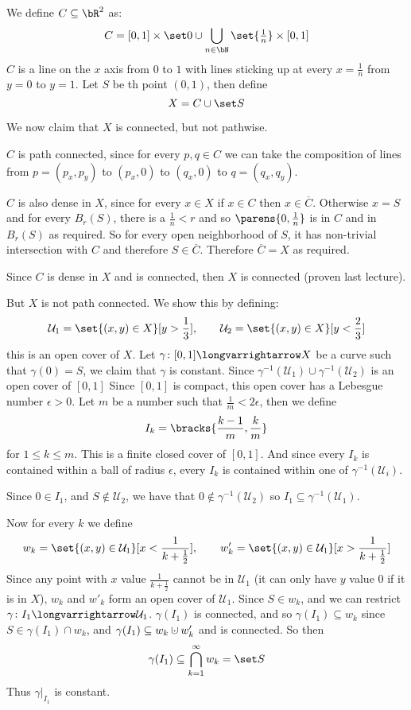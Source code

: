 \documentclass[10pt]{article}
\def\mU{\mathcal{U}}
\def\longto{\longvarrightarrow}
\begin{document}
\begin{exam*}

    We define $C\subseteq\bR^2$ as:
    \[ C = [0,1]\times\set 0\cup\bigcup_{n\in\bN}\set{\tfrac1n}\times[0,1] \]
    $C$ is a line on the $x$ axis from $0$ to $1$ with lines sticking up at every $x=\frac1n$ from $y=0$ to $y=1$.
    Let $S$ be th point $(0,1)$, then define
    \[ X = C\cup\set S \]

    We now claim that $X$ is connected, but not pathwise.

    $C$ is path connected, since for every $p,q\in C$ we can take the composition of lines from $p=(p_x,p_y)$ to $(p_x,0)$ to $(q_x,0)$ to $q=(q_x,q_y)$.

    $C$ is also dense in $X$, since for every $x\in X$ if $x\in C$ then $x\in\overline C$.
    Otherwise $x=S$ and for every $B_r(S)$, there is a $\frac1n<r$ and so $\parens{0,\frac1n}$ is in $C$ and in $B_r(S)$ as required.
    So for every open neighborhood of $S$, it has non-trivial intersection with $C$ and therefore $S\in\overline C$.
    Therefore $\overline C=X$ as required.

    Since $C$ is dense in $X$ and is connected, then $X$ is connected (proven last lecture).

    But $X$ is not path connected.
    We show this by defining:
    \[ \mU_1 = \set{(x,y)\in X}[y>\frac13],\qquad \mU_2=\set{(x,y)\in X}[y<\frac23] \]
    this is an open cover of $X$.
    Let $\gamma\colon[0,1]\longto X$ be a curve such that $\gamma(0)=S$, we claim that $\gamma$ is constant.
    Since $\gamma^{-1}(\mU_1)\cup\gamma^{-1}(\mU_2)$ is an open cover of $[0,1]$
    Since $[0,1]$ is compact, this open cover has a Lebesgue number $\epsilon>0$.
    Let $m$ be a number such that $\frac1m<2\epsilon$, then we define
    \[ I_k = \bracks{\frac{k-1}m, \frac km} \]
    for $1\leq k\leq m$.
    This is a finite closed cover of $[0,1]$.
    And since every $I_k$ is contained within a ball of radius $\epsilon$, every $I_k$ is contained within one of $\gamma^{-1}(\mU_i)$.

    Since $0\in I_1$, and $S\notin\mU_2$, we have that $0\notin\gamma^{-1}(\mU_2)$ so $I_1\subseteq\gamma^{-1}(\mU_1)$.

    Now for every $k$ we define
    \[ w_k = \set{(x,y)\in\mU_1}[x<\frac1{k+\frac12}],\qquad w'_k=\set{(x,y)\in\mU_1}[x>\frac1{k+\frac12}] \]
    Since any point with $x$ value $\frac1{k+\frac12}$ cannot be in $\mU_1$ (it can only have $y$ value $0$ if it is in $X$), $w_k$ and $w'_k$ form an open cover of $\mU_1$.
    Since $S\in w_k$, and we can restrict $\gamma\colon I_1\longto\mU_1$.
    $\gamma(I_1)$ is connected, and so $\gamma(I_1)\subseteq w_k$ since $S\in\gamma(I_1)\cap w_k$, and $\gamma(I_1)\subseteq w_k\dcup w'_k$ and is connected.
    So then
    \[ \gamma(I_1) \subseteq \bigcap_{k=1}^\infty w_k = \set S \]
    Thus $\gamma\bigl|_{I_1}$ is constant.


\end{exam*}
\end{document}
